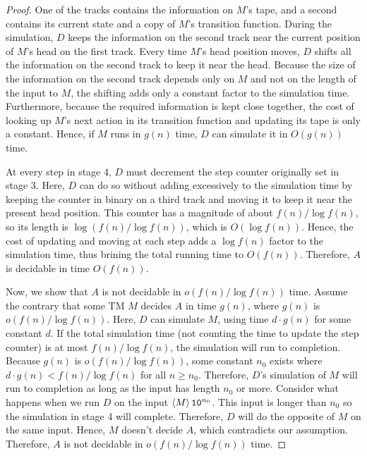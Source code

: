\documentclass[11pt,twoside=off,numbers=noenddot]{scrbook}
\begin{document}
\begin{proof}
  One of the tracks contains the information on $M$'s tape, and a second contains its current state and a copy of $M$'s transition function. During the simulation, $D$ keeps the information on the second track near the current position of $M$'s head on the first track. Every time $M$'s head position moves, $D$ shifts all the information on the second track to keep it near the head. Because the size of the information on the second track depends only on $M$ and not on the length of the input to $M$, the shifting adds only a constant factor to the simulation time. Furthermore, because the required information is kept close together, the cost of looking up $M$'s next action in its transition function and updating its tape is only a constant. Hence, if $M$ runs in $g(n)$ time, $D$ can simulate it in $O(g(n))$ time.

  At every step in stage 4, $D$ must decrement the step counter originally set in stage 3. Here, $D$ can do so without adding excessively to the simulation time by keeping the counter in binary on a third track and moving it to keep it near the present head position. This counter has a magnitude of about $f(n) / \log f(n)$, so its length is $\log(f(n) / \log f(n))$, which is $O(\log f(n))$. Hence, the cost of updating and moving at each step adds a $\log f(n)$ factor to the simulation time, thus brining the total running time to $O(f(n))$. Therefore, $A$ is decidable in time $O(f(n))$.

  Now, we show that $A$ is not decidable in $o(f(n) / \log f(n))$ time. Assume the contrary that some TM $M$ decides $A$ in time $g(n)$, where $g(n)$ is $o(f(n) / \log f(n))$. Here, $D$ can simulate $M$, using time $d \cdot g(n)$ for some constant $d$. If the total simulation time (not counting the time to update the step counter) is at most $f(n) / \log f(n)$, the simulation will run to completion. Because $g(n)$ is $o(f(n) / \log f(n))$, some constant $n_0$ exists where $d \cdot g(n) < f(n) / \log f(n)$ for all $n \geq n_0$. Therefore, $D$'s simulation of $M$ will run to completion as long as the input has length $n_0$ or more. Consider what happens when we run $D$ on the input $\left< M \right>\texttt{1}\texttt{0}^{n_0}$. This input is longer than $n_0$ so the simulation in stage 4 will complete. Therefore, $D$ will do the opposite of $M$ on the same input. Hence, $M$ doesn't decide $A$, which contradicts our assumption. Therefore, $A$ is not decidable in $o(f(n) / \log f(n))$ time.
\end{proof}
\end{document}
